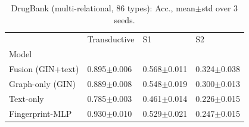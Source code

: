 \begin{table}[t]
\caption{DrugBank (multi-relational, 86 types): Acc., mean$\pm$std over 3 seeds.}
\label{tab:drugbank-accuracy}
\begin{tabular}{llll}
\toprule
 & Transductive & S1 & S2 \\
Model &  &  &  \\
\midrule
Fusion (GIN+text) & 0.895$\pm$0.006 & 0.568$\pm$0.011 & 0.324$\pm$0.038 \\
Graph-only (GIN) & 0.889$\pm$0.008 & 0.548$\pm$0.019 & 0.300$\pm$0.013 \\
Text-only & 0.785$\pm$0.003 & 0.461$\pm$0.014 & 0.226$\pm$0.015 \\
Fingerprint-MLP & 0.930$\pm$0.010 & 0.529$\pm$0.021 & 0.247$\pm$0.015 \\
\bottomrule
\end{tabular}
\end{table}
